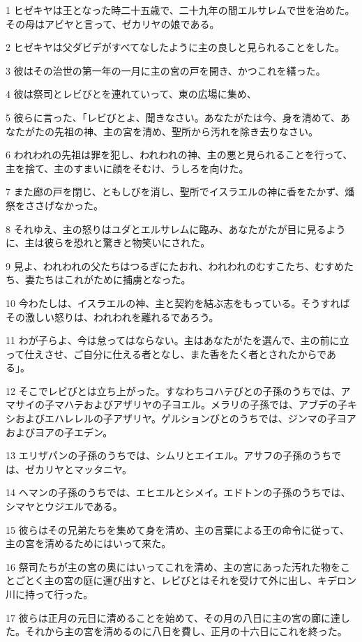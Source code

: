 \par 1 ヒゼキヤは王となった時二十五歳で、二十九年の間エルサレムで世を治めた。その母はアビヤと言って、ゼカリヤの娘である。
\par 2 ヒゼキヤは父ダビデがすべてなしたように主の良しと見られることをした。
\par 3 彼はその治世の第一年の一月に主の宮の戸を開き、かつこれを繕った。
\par 4 彼は祭司とレビびとを連れていって、東の広場に集め、
\par 5 彼らに言った、「レビびとよ、聞きなさい。あなたがたは今、身を清めて、あなたがたの先祖の神、主の宮を清め、聖所から汚れを除き去りなさい。
\par 6 われわれの先祖は罪を犯し、われわれの神、主の悪と見られることを行って、主を捨て、主のすまいに顔をそむけ、うしろを向けた。
\par 7 また廊の戸を閉じ、ともしびを消し、聖所でイスラエルの神に香をたかず、燔祭をささげなかった。
\par 8 それゆえ、主の怒りはユダとエルサレムに臨み、あなたがたが目に見るように、主は彼らを恐れと驚きと物笑いにされた。
\par 9 見よ、われわれの父たちはつるぎにたおれ、われわれのむすこたち、むすめたち、妻たちはこれがために捕虜となった。
\par 10 今わたしは、イスラエルの神、主と契約を結ぶ志をもっている。そうすればその激しい怒りは、われわれを離れるであろう。
\par 11 わが子らよ、今は怠ってはならない。主はあなたがたを選んで、主の前に立って仕えさせ、ご自分に仕える者となし、また香をたく者とされたからである」。
\par 12 そこでレビびとは立ち上がった。すなわちコハテびとの子孫のうちでは、アマサイの子マハテおよびアザリヤの子ヨエル。メラリの子孫では、アブデの子キシおよびエハレレルの子アザリヤ。ゲルションびとのうちでは、ジンマの子ヨアおよびヨアの子エデン。
\par 13 エリザパンの子孫のうちでは、シムリとエイエル。アサフの子孫のうちでは、ゼカリヤとマッタニヤ。
\par 14 ヘマンの子孫のうちでは、エヒエルとシメイ。エドトンの子孫のうちでは、シマヤとウジエルである。
\par 15 彼らはその兄弟たちを集めて身を清め、主の言葉による王の命令に従って、主の宮を清めるためにはいって来た。
\par 16 祭司たちが主の宮の奥にはいってこれを清め、主の宮にあった汚れた物をことごとく主の宮の庭に運び出すと、レビびとはそれを受けて外に出し、キデロン川に持って行った。
\par 17 彼らは正月の元日に清めることを始めて、その月の八日に主の宮の廊に達した。それから主の宮を清めるのに八日を費し、正月の十六日にこれを終った。
